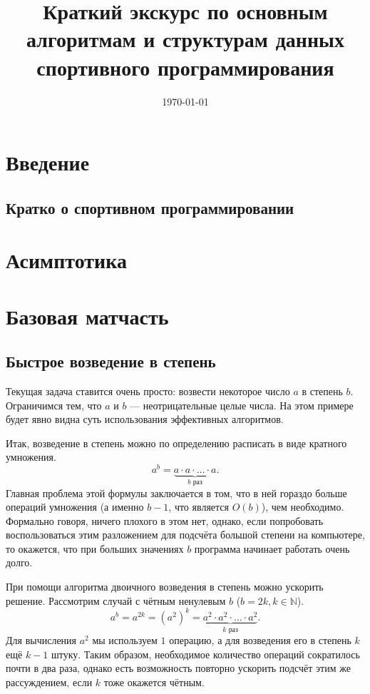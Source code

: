 \documentclass[a4paper,8pt]{article}
\begin{document}
\title{Краткий экскурс по основным алгоритмам и структурам данных спортивного программирования}
\date{\today}
\maketitle
\newpage
\tableofcontents
\newpage

\section{Введение}
    \subsection{Кратко о спортивном программировании}
\section{Асимптотика} 
\section{Базовая матчасть}
    \subsection{Быстрое возведение в степень}
        Текущая задача ставится очень просто: возвести некоторое число \(a\) в степень \(b\). Ограничимся тем, что $a$ и $b$ --- неотрицательные целые числа. На этом примере будет явно видна суть использования эффективных алгоритмов.

        Итак, возведение в степень можно по определению расписать в виде кратного умножения.
        \[a^b=\underbrace{a \cdot a \cdot \ldots \cdot a}_\text{\(b\) раз}.\]
        Главная проблема этой формулы заключается в том, что в ней гораздо больше операций умножения (а именно $b - 1$, что является \(O(b)\)), чем необходимо. Формально говоря, ничего плохого в этом нет, однако, если попробовать воспользоваться этим разложением для подсчёта большой степени на компьютере, то окажется, что при больших значениях \(b\) программа начинает работать очень долго.

        При помощи алгоритма двоичного возведения в степень можно ускорить решение. Рассмотрим случай с чётным ненулевым $b$ (\(b = 2k, k \in \mathbb{N}\)).
        \[a^b = a^{2k} = (a^{2})^k = \underbrace{a^2 \cdot a^2 \cdot \ldots \cdot a^2}_\text{\(k\) раз}.\]
        Для вычисления $a^2$ мы используем $1$ операцию, а для возведения его в степень $k$ ещё $k - 1$ штуку. Таким образом, необходимое количество операций сократилось почти в два раза, однако есть возможность повторно ускорить подсчёт этим же рассуждением, если $k$ тоже окажется чётным.
\end{document}
